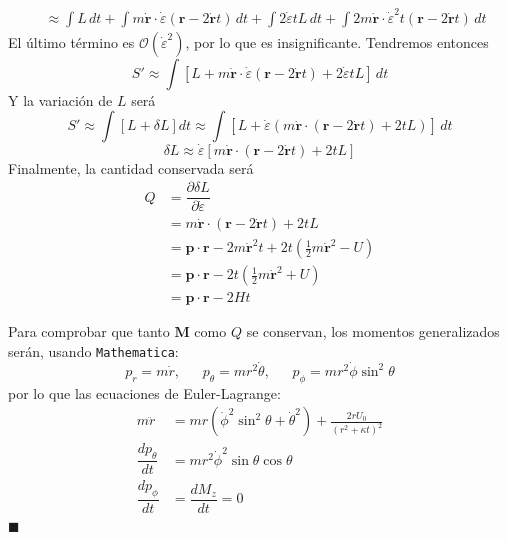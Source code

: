 \documentclass[]{article}
\numberwithin{equation}{section}
\newcommand{\0}{\textcolor{gray}{0}}
\newcommand{\rv}{\mathbf{r}}
\newcommand{\pv}{\mathbf{p}}
\newcommand{\pd}[2]{\dfrac{\partial #1}{\partial #2}}
\newcommand{\td}[2]{\dfrac{d #1}{d #2}}
\newcommand{\n}[1]{\mathbf{#1}}
\newcommand{\qed}{\hfill\(\blacksquare\)}
\begin{document}
\begin{enumerate}
\begin{align*}
		&\approx \int L \, dt + \int m \dot{\rv} \cdot \dot{\varepsilon} \left(\rv - 2 \dot{\rv} t\right) \, dt + \int 2 \dot{\varepsilon} t L \, dt + \int 2 m \dot{\rv} \cdot \dot{\varepsilon}^2 t \left(\rv - 2 \dot{\rv} t\right) \, dt
	\end{align*}
	El último término es $\mathcal{O}(\dot{\varepsilon}^2)$, por lo que es insignificante. Tendremos entonces
	\begin{equation*}
		S' \approx \int \left[L + m \dot{\rv} \cdot \dot{\varepsilon} \left(\rv - 2 \dot{\rv} t\right) + 2 \dot{\varepsilon} t L\right] \, dt
	\end{equation*}
	Y la variación de $L$ será
	\begin{equation*}
		S' \approx \int \left[L + \delta L\right] dt \approx \int \left[L + \dot{\varepsilon} \left( m \dot{\rv} \cdot \left(\rv - 2 \dot{\rv} t\right) + 2 t L\right)\right] \, dt
	\end{equation*}
	\begin{equation*}
		\delta L \approx \dot{\varepsilon}\left[ m \dot{\rv} \cdot \left(\rv - 2 \dot{\rv} t\right) + 2 t L\right]
	\end{equation*}
	Finalmente, la cantidad conservada será
	\begin{align*}
		Q &= \pd{\delta L}{\dot{\varepsilon}}\\
		&= m \dot{\rv} \cdot \left(\rv - 2 \dot{\rv} t\right) + 2 t L\\
		&= \pv \cdot \rv - 2 m \dot{\rv}^2 t + 2 t \left(\frac{1}{2}m \dot{\rv}^2 - U\right)\\
		&= \pv \cdot \rv - 2 t \left(\frac{1}{2}m \dot{\rv}^2 + U\right)\\
		&= \pv \cdot \rv - 2 H t
	\end{align*}
	
	Para comprobar que tanto $\n{M}$ como $Q$ se conservan, los momentos generalizados serán, usando \texttt{Mathematica}:
	\begin{equation*}
		p_r = m \dot{r}, ~~~~~~~ p_\theta = m r^2 \dot{\theta}, ~~~~~~~ p_\phi = m r^2 \dot{\phi} \sin^2 \theta
	\end{equation*}
	por lo que las ecuaciones de Euler-Lagrange:
	\begin{align*}
		m\ddot{r} &= m r \left(\dot{\phi}^2 \sin^2 \theta + \dot{\theta}^2 \right)+\frac{2 r U_0}{\left(r^2+\kappa  t\right)^2}\\
		\td{p_\theta}{t} &= m r^2 \dot{\phi}^2 \sin\theta \cos\theta\\
		\td{p_\phi}{t} &= \td{M_z}{t} = 0
	\end{align*}
	\qed
	

\end{enumerate}
\end{document}
